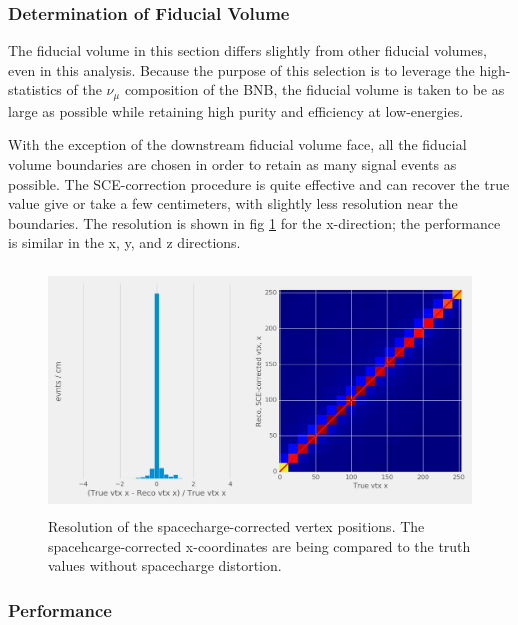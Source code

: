 \subsubsection{Determination of Fiducial Volume}
\label{sssec:NuMUCCsel:constr:FV}

\par The fiducial volume in this section differs slightly from other fiducial volumes, even in this analysis. Because the purpose of this selection is to leverage the high-statistics of the $\nu_{\mu}$ composition of the BNB, the fiducial volume is taken to be as large as possible while retaining high purity and efficiency at low-energies.

\par With the exception of the downstream fiducial volume face, all the fiducial volume boundaries are chosen in order to retain as many signal events as possible. The SCE-correction procedure is quite effective and can recover the true value give or take a few centimeters, with slightly less resolution near the boundaries. The resolution is shown in fig \ref{fig:NuMUCCsel:ryan:sceres_x} for the x-direction; the performance is similar in the x, y, and z directions. 

\begin{figure}
    \centering
    \includegraphics[height=6.5cm]{NuMuCCsel/Images/Ryan/sceresolution_x.jpg} \hspace{2mm}
    \caption{Resolution of the spacecharge-corrected vertex positions. The spacehcarge-corrected x-coordinates are being compared to the truth values without spacecharge distortion. }
    \label{fig:NuMUCCsel:ryan:sceres_x}
\end{figure}

\subsubsection{Performance}
\label{sssec:NuMUCCsel:constr:performance}

